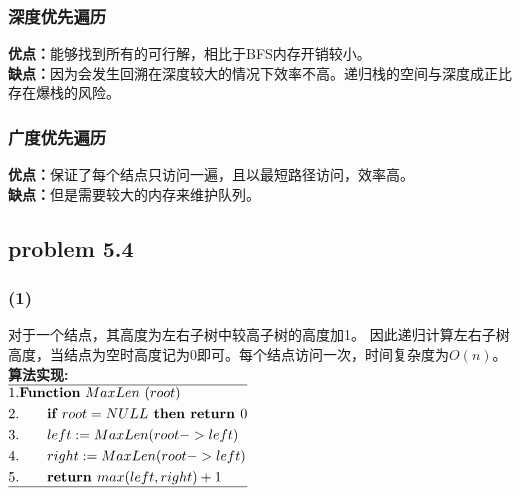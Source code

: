 \documentclass[11pt,a4paper,oneside,oldfontcommands]{ctexart}
\begin{document}
\subsubsection*{深度优先遍历}
\noindent \textbf{优点：}能够找到所有的可行解，相比于BFS内存开销较小。\\
\textbf{缺点：}因为会发生回溯在深度较大的情况下效率不高。递归栈的空间与深度成正比存在爆栈的风险。
\subsubsection*{广度优先遍历}
\noindent\textbf{优点：}保证了每个结点只访问一遍，且以最短路径访问，效率高。\\
\textbf{缺点：}但是需要较大的内存来维护队列。
{\subsection*{problem 5.4}}
\subsubsection*{(1)}
\noindent 对于一个结点，其高度为左右子树中较高子树的高度加1。
因此递归计算左右子树高度，当结点为空时高度记为0即可。每个结点访问一次，时间复杂度为$O(n)$。\\
\textbf{算法实现:}\\
$
	\begin{aligned}
		\hline
		 & 1.\textbf{Function}\ {MaxLen}\ (root)                        \\
		 & 2.\hspace*{20pt}\textbf{if }root=NULL\textbf{ then return }0 \\
		 & 3.\hspace*{20pt}left:=MaxLen(root->left)                     \\
		 & 4.\hspace*{20pt}right:=MaxLen(root->left)                    \\
		 & 5.\hspace*{20pt}\textbf{return }max(left,right)+1            \\
		\hline
	\end{aligned}
$
\end{document}
